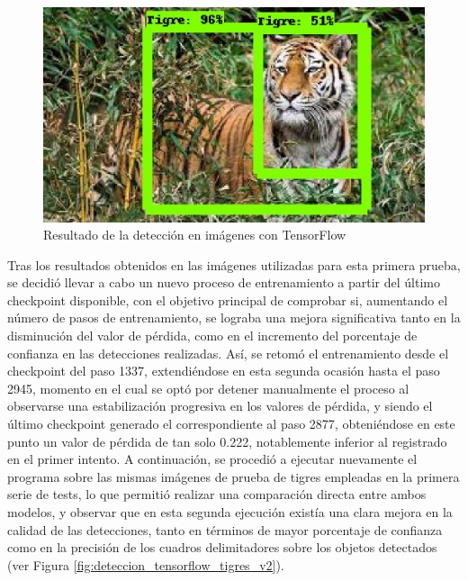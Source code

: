 \begin{figure}[H]
\begin{minipage}{0.46\textwidth}
  \end{minipage}
  \hspace{2mm}
  \begin{minipage}{0.46\textwidth}
    \centering
    \includegraphics[width=\linewidth]{figs/tigre_5.jpeg}
  \end{minipage}
  \caption{Resultado de la detección en imágenes con TensorFlow}
  \label{fig:deteccion_tensorflow_tigres}
  \end{figure}
 
Tras los resultados obtenidos en las imágenes utilizadas para esta primera prueba, se decidió llevar a cabo un nuevo proceso de entrenamiento a partir del último checkpoint disponible, con el objetivo principal de comprobar si, aumentando el número de pasos de entrenamiento, se lograba una mejora significativa tanto en la disminución del valor de pérdida, como en el incremento del porcentaje de confianza en las detecciones realizadas.
Así, se retomó el entrenamiento desde el checkpoint del paso 1337, extendiéndose en esta segunda ocasión hasta el paso 2945, momento en el cual se optó por detener manualmente el proceso al observarse una estabilización progresiva en los valores de pérdida, y siendo el último checkpoint generado el correspondiente al paso 2877, obteniéndose en este punto un valor de pérdida de tan solo 0.222, notablemente inferior al registrado en el primer intento. A continuación, se procedió a ejecutar nuevamente el programa sobre las mismas imágenes de prueba de tigres empleadas en la primera serie de tests, lo que permitió realizar una comparación directa entre ambos modelos, y observar que en esta segunda ejecución existía una clara mejora en la calidad de las detecciones, tanto en términos de mayor porcentaje de confianza como en la precisión de los cuadros delimitadores sobre los objetos detectados (ver Figura \ref{fig:deteccion_tensorflow_tigres_v2}).

